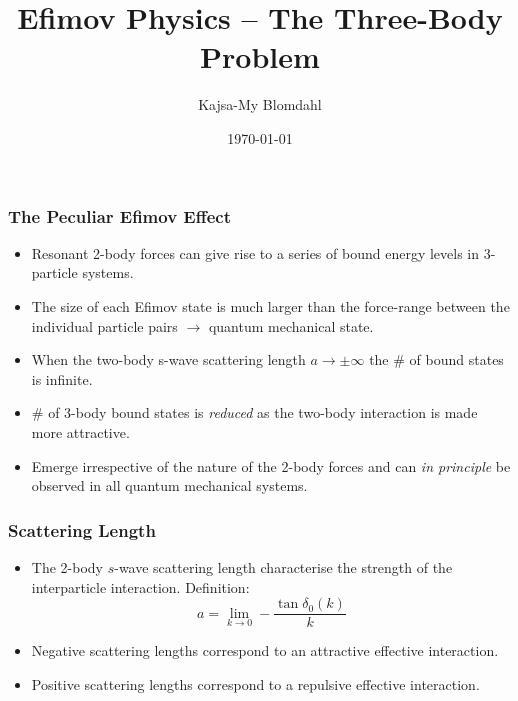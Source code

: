 \documentclass{beamer}
\title[Short title]{Efimov Physics -- The Three-Body Problem} %
\author{Kajsa-My Blomdahl} %
\institute[SU] %
{
Stockholms Universitet \\ %
\medskip
\textit{kajsamy.blomdahl@fysik.su.se} %
}
\date{\today} %
\begin{document}
\begin{frame}
\titlepage %
\end{frame}


\begin{frame}
\frametitle{The Peculiar Efimov Effect}
\begin{itemize}
\item Resonant 2-body forces can give rise to a series of bound energy levels in 3-particle systems.
\item The size of each Efimov state is much larger than the force-range between the individual particle pairs $\rightarrow$ quantum mechanical state.
\item When the two-body s-wave scattering length $a \rightarrow \pm\infty$ the $\#$ of bound states is infinite.
\item  $\#$ of 3-body bound states is \textit{reduced} as the two-body interaction is made more attractive.
\item Emerge irrespective of the nature of the 2-body forces and can \textit{in principle} be observed in all quantum mechanical systems. 
\end{itemize}
\end{frame}


\begin{frame}
\frametitle{Scattering Length}
\begin{itemize}
	\item The 2-body $s$-wave scattering length characterise the strength of the interparticle interaction. Definition:
	\begin{equation}
	a = \lim_{k \to 0} -\frac{\tan\delta_0(k)}{k}
	\end{equation}
	\item Negative scattering lengths correspond to an attractive effective interaction.
	\item Positive scattering lengths correspond to a repulsive effective interaction.
\end{itemize}
\end{frame}
\end{document}
